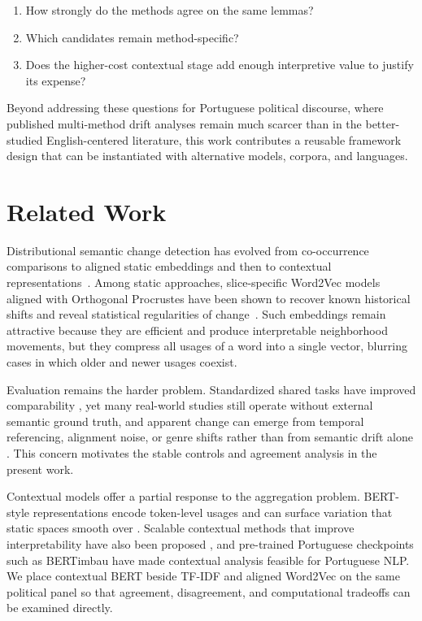 \documentclass[12pt]{article}
\begin{document}
\begin{enumerate}
    \item How strongly do the methods agree on the same lemmas? 

    \item Which candidates remain method-specific?

    \item Does the higher-cost contextual
stage add enough interpretive value to justify its expense?
\end{enumerate}

Beyond addressing these questions for Portuguese political discourse, where
published multi-method drift analyses remain much scarcer than in the
better-studied English-centered literature, this work contributes a reusable
framework design that can be instantiated with alternative models, corpora, and
languages.

\section{Related Work}
\label{sec:related_work}

Distributional semantic change detection has evolved from co-occurrence
comparisons to aligned static embeddings and then to contextual
representations~\cite{kutuzov-etal-2018-diachronic,tahmasebi-etal-2021-computational}.
Among static approaches, slice-specific Word2Vec models aligned with Orthogonal
Procrustes have been shown to recover known historical shifts and reveal
statistical regularities of
change~\cite{hamilton-etal-2016-diachronic}.
Such embeddings remain attractive because they are efficient and produce
interpretable neighborhood movements, but they compress all usages of a word
into a single vector, blurring cases in which older and newer usages coexist.

Evaluation remains the harder problem. Standardized shared tasks have improved
comparability \cite{schlechtweg-etal-2020-semeval}, yet many real-world studies
still operate without external semantic ground truth, and apparent change can
emerge from temporal referencing, alignment noise, or genre shifts rather than
from semantic drift alone \cite{dubossarsky-etal-2019-timeout}. This concern
motivates the stable controls and agreement analysis in the present work.

Contextual models offer a partial response to the aggregation problem.
BERT-style representations encode token-level usages and can surface variation
that static spaces smooth over
\cite{giulianelli-etal-2020-analysing,devlin-etal-2019-bert}.
Scalable contextual methods that improve interpretability have also been
proposed \cite{montariol-etal-2021-scalable}, and pre-trained Portuguese
checkpoints such as BERTimbau \cite{souza-etal-2020-bertimbau} have made
contextual analysis feasible for Portuguese NLP\@. We place contextual BERT
beside TF-IDF and aligned Word2Vec on the same
political panel so that agreement, disagreement, and computational tradeoffs
can be examined directly.
\end{document}
